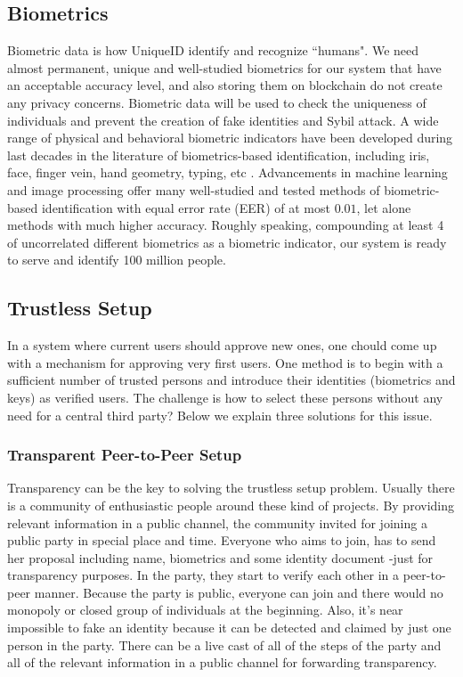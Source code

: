 \documentclass[conference]{IEEEtran}
\begin{document}
\subsection{Biometrics}
Biometric data is how UniqueID identify and recognize ``humans". We need almost permanent, unique and well-studied biometrics for our system that have an acceptable accuracy level, and also storing them on blockchain do not create any privacy concerns.
Biometric data will be used to check the uniqueness of individuals and prevent the creation of fake identities and Sybil attack. A wide range of physical and behavioral biometric indicators have been developed during last decades in the literature of biometrics-based identification, including iris, face, finger vein, hand geometry, typing, etc \cite{intro-biometic}. Advancements in machine learning and image processing offer many well-studied and tested methods of biometric-based identification with equal error rate (EER) of at most $0.01$, let alone methods with much higher accuracy. Roughly speaking, compounding at least 4 of uncorrelated different biometrics as a biometric indicator, our system is ready to serve and identify 100 million people.

\subsection{Trustless Setup}
In a system where current users should approve new ones, one chould come up with a mechanism for approving very first users. One method is to begin with a sufficient number of trusted persons and introduce their identities (biometrics and keys) as verified users. The challenge is how to select these persons without any need for a central third party? Below we explain three solutions for this issue.

\subsubsection*{Transparent Peer-to-Peer Setup} 
Transparency can be the key to solving the trustless setup problem. Usually there is a community of enthusiastic people around these kind of projects. By providing relevant information in a public channel, the community invited for joining a public party in special place and time. Everyone who aims to join, has to send her proposal including name, biometrics and some identity document -just for transparency purposes. In the party, they start to verify each other in a peer-to-peer manner. Because the party is public, everyone can join and there would no monopoly or closed group of individuals at the beginning. Also, it's near impossible to fake an identity because it can be detected and claimed by just one person in the party. There can be a live cast of all of the steps of the party and  all of the relevant information in a public channel for forwarding transparency.
\end{document}
